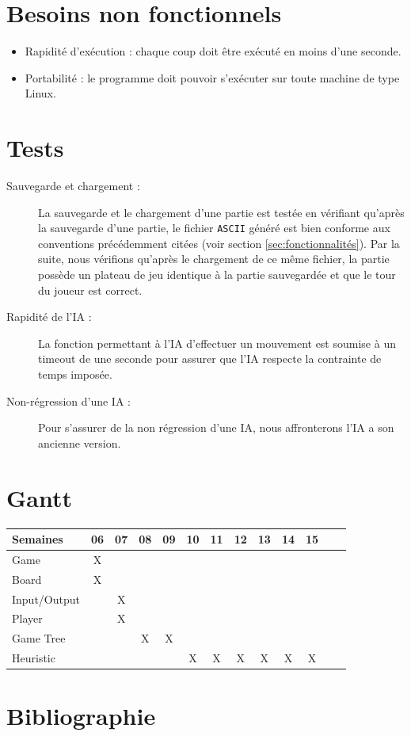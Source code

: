 \documentclass[10pt,a4paper]{article}
\begin{document}
\section{Besoins non fonctionnels}
\label{sec:besoins_non_fonctionnels}
\begin{itemize} 
\item Rapidité d'exécution : chaque coup doit être exécuté en moins d'une seconde.
\item Portabilité : le programme doit pouvoir s'exécuter sur toute machine de type Linux.
\end{itemize}

\section{Tests}
\label{sec:tests}

\begin{description}
\item [Sauvegarde et chargement :] La sauvegarde et le chargement d'une partie est testée en vérifiant qu'après la sauvegarde d'une partie, le fichier \verb!ASCII! généré est bien conforme aux conventions précédemment citées (voir section \ref{sec:fonctionnalités}). Par la suite, nous vérifions qu'après le chargement de ce même fichier, la partie possède un plateau de jeu identique à la partie sauvegardée et que le tour du joueur est correct.
\item [Rapidité de l'IA :] La fonction permettant à l'IA d'effectuer un mouvement est soumise à un timeout de une seconde pour assurer que l'IA respecte la contrainte de temps imposée.
\item [Non-régression d'une IA :] Pour s'assurer de la non régression d'une IA, nous affronterons l'IA a son ancienne version.
\end{description}


\section{Gantt}

\begin{center}
\begin{tabular}{| l | c | c | c | c | c | c | c | c | c | c | c | c |}
\hline
Semaines     & 06 & 07 & 08 & 09 & 10 & 11 & 12 & 13 & 14 & 15  \\ \hline
Game         & X  &    &    &    &    &    &    &    &    &     \\ \hline
Board        & X  &    &    &    &    &    &    &    &    &     \\ \hline
Input/Output &    & X  &    &    &    &    &    &    &    &     \\ \hline
Player       &    & X  &    &    &    &    &    &    &    &     \\ \hline
Game Tree    &    &    & X  & X  &    &    &    &    &    &     \\ \hline
Heuristic    &    &    &    &    &  X & X  & X  & X  & X  & X   \\ \hline
\end{tabular}
\end{center}
\newpage

\section{Bibliographie}


{}
\nocite{*}
\end{document}
